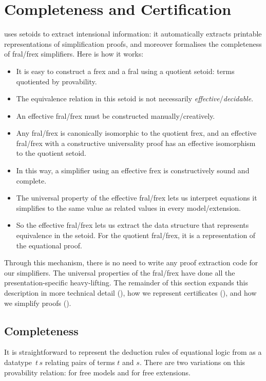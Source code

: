 
\section{Completeness and Certification}
%
\Frexlib{} uses setoids to extract intensional information: it
automatically extracts printable representations of simplification proofs, and moreover formalises
the completeness of fral/frex simplifiers. Here is how it works:
\begin{itemize}
\item It is easy to construct a frex and a fral using
      a quotient setoid: terms quotiented by provability.
\item The equivalence relation in this setoid is not necessarily
  \emph{effective}/\emph{decidable}.
\item An effective fral/frex must be constructed manually/creatively.
\item Any fral/frex is canonically isomorphic to the quotient frex, and an
  effective fral/frex with a constructive universality proof has an effective isomorphism to
  the quotient setoid.
\item In this way, a simplifier using an effective frex is
  constructively sound and complete.
\item The universal property of the effective fral/frex lets us
  interpret equations it simplifies to the same value as related
  values in every model/extension.
\item
  So the effective fral/frex lets us extract the data structure that represents
  equivalence in the setoid. For the
  quotient fral/frex, it is a representation of the equational proof.
\end{itemize}
Through this mechanism, there is no need to write any proof extraction
code for our simplifiers. The universal properties of the fral/frex
have done all the presentation-specific heavy-lifting. The remainder
of this section expands this description in more technical detail
(), how \Frexlib{} we represent certificates
(), and how we simplify proofs
().

\subsection{Completeness}
%
It is straightforward to represent the deduction rules of equational
logic from  as a datatype
$\,t\,s$ relating pairs of terms $t$ and $s$.
There are two variations on this provability relation: for free models
and for free extensions.

